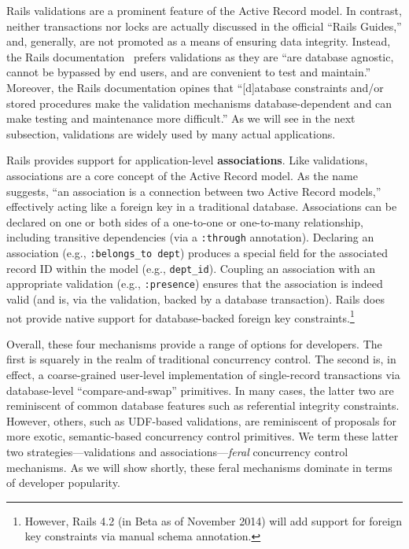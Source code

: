 \begin{myenumerate}
  Rails validations are a prominent feature of the Active Record
  model. In contrast, neither transactions nor locks are actually
  discussed in the official ``Rails Guides,'' and, generally, are not
  promoted as a means of ensuring data integrity. Instead, the Rails
  documentation~\cite{rails-guide} prefers validations as they are
  ``are database agnostic, cannot be bypassed by end users, and are
  convenient to test and maintain.'' Moreover, the Rails documentation
  opines that ``[d]atabase constraints and/or stored procedures make
  the validation mechanisms database-dependent and can make testing
  and maintenance more difficult.'' As we will see in the next
  subsection, validations are widely used by many actual applications.

\item Rails provides support for application-level
  \textbf{associations}. Like validations, associations are a core
  concept of the Active Record model. As the name suggests, ``an
  association is a connection between two Active Record models,''
  effectively acting like a foreign key in a traditional
  database. Associations can be declared on one or both sides of a
  one-to-one or one-to-many relationship, including transitive
  dependencies (via a \texttt{:through} annotation). Declaring an
  association (e.g., \texttt{:belongs\_to dept}) produces a special
  field for the associated record ID within the model (e.g.,
  \texttt{dept\_id}). Coupling an association with an appropriate
  validation (e.g., \texttt{:presence}) ensures that the association
  is indeed valid (and is, via the validation, backed by a database
  transaction). Rails does not provide native support for
  database-backed foreign key constraints.\footnote{However, Rails 4.2
    (in Beta as of November 2014) will add support for foreign key
    constraints via manual schema annotation.}
\end{myenumerate}

Overall, these four mechanisms provide a range of options for
developers. The first is squarely in the realm of traditional
concurrency control. The second is, in effect, a coarse-grained
user-level implementation of single-record transactions via
database-level ``compare-and-swap'' primitives. In many cases, the
latter two are reminiscent of common database features such as
referential integrity constraints. However, others, such as UDF-based
validations, are reminiscent of proposals for more exotic,
semantic-based concurrency control primitives. We term these latter
two strategies---validations and associations---\textit{feral}
concurrency control mechanisms. As we will show shortly, these feral
mechanisms dominate in terms of developer popularity.

